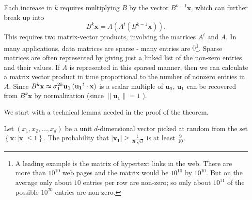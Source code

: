 Each increase in \(k\) requires multiplying \(B\) by the vector \(B^{k-1} \mathbf{x} \), which can further break up into 
\[
  B^k \mathbf{x} = A \left( A^t \left( B^{k-1} \mathbf{x}  \right)  \right) .
\]   
This requires two matrix-vector products, involving the matrices \(A^t\) and \(A\). In many applications, data matrices are sparse - many entries are \(0\)\footnote{A leading example is the matrix of hypertext links in the web. There are more than \(10^{10} \) web pages and the matrix would be \(10^{10} \) by \(10^{10} \). But on the average only about \(10\) entries per row are non-zero; so only about \(10^{11} \) of the possible \(10^{20} \) entries are non-zero. }. Sparse matrices are often represented by giving just a linked list of the non-zero entries and their values. If \(A\) is represented in this sparsed manner, then we can calculate a matrix vector product in time proportional to the number of nonzero entries in \(A\). Since \(B^k \mathbf{x} \thickapprox  \sigma _1^{2k} \mathbf{u_1} \left( \mathbf{u_1}^t \cdot \mathbf{x}   \right)  \)   is a scalar multiple of \(\mathbf{u_1} \), \(\mathbf{u_1} \) can be recovered from \(B^k \mathbf{x} \) by normalization (since \(\lVert \mathbf{u_1}  \rVert = 1 \) ).       

We start with a technical lemma needed in the proof of the theorem. 

\begin{lemma} \label{lm: Pr 9/10}
  Let \((x_1, x_2, \dots , x_d)\) be a unit \(d\)-dimensional vector picked at random from the set \(\left\{ \mathbf{x} : \vert \mathbf{x}  \vert \le 1  \right\} \). The probability that \(\vert \mathbf{x_1}  \vert \ge \frac{1}{20\sqrt{d} } \) is at least \(\frac{9}{10}\).     
\end{lemma}

